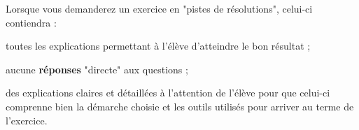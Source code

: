 Lorsque vous demanderez un exercice en "pistes de résolutions", celui-ci contiendra :
\item toutes les explications permettant à l'élève d'atteindre le bon résultat ;
\item aucune \textbf{réponses} "directe" aux questions ;
\item des explications claires et détaillées à l'attention de l'élève pour que celui-ci comprenne bien la démarche choisie et les outils utilisés pour arriver au terme de l'exercice.